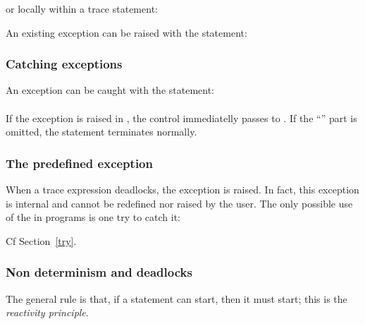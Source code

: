    or locally within a trace statement:

    



An existing exception  can be raised with the statement:
 \\

\subsubsection{Catching exceptions}

An  exception  can  be   caught  with  the  statement:\\  
     \\ If the exception
is raised in , the control immediatelly passes to .
If  the  ``''  part  is  omitted,  the  statement  terminates
normally.



\subsubsection{The predefined  exception}

When a  trace expression  deadlocks, the   exception is
raised.  In fact, this exception  is internal and cannot be redefined
nor raised by the user.   The only possible use of the 
in programs is one try to catch it: 

\begin{example}
\begin{program}
       
\end{program}
\end{example}

Cf Section~\ref{try}.





\subsubsection{Non determinism and deadlocks}
The general rule is that, if a statement can start, then it must 
start; this is the {\em reactivity principle}.


